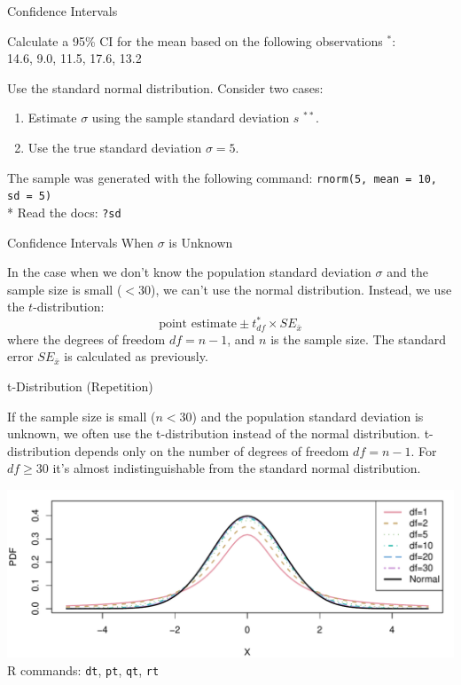 \begin{frame}{Confidence Intervals}

     \begin{example}
         \medskip
         Calculate a 95\% CI for the mean based on the following observations $^{*}$:\\
         14.6, 9.0, 11.5, 17.6, 13.2
         
         Use the standard normal distribution. Consider two cases:
         \begin{enumerate}
             \item Estimate $\sigma$ using the sample standard deviation $s$ $^{**}$.
             \item Use the true standard deviation $\sigma = 5$.
         \end{enumerate}
     \end{example}
    \bigskip

    \tiny * The sample was generated with the following command: \texttt{rnorm(5, mean = 10, sd = 5)}\\
    \tiny ** Read the docs: \texttt{?sd}

\end{frame}

\begin{frame}{Confidence Intervals When $\sigma$ is Unknown}

    In the case when we don't know the population standard deviation $\sigma$ and the sample size is small ($< 30$), we can't use the normal distribution. Instead, we use the $t$-distribution:
    \begin{equation}
    \text{point estimate} \pm t_{df}^* \times SE_{\bar{x}}
    \end{equation}   
    where the degrees of freedom $df = n - 1$, and $n$ is the sample size. The standard error $SE_{\bar{x}}$ is calculated as previously.

\end{frame}

\begin{frame}{t-Distribution (Repetition)}
    
    If the sample size is small ($n < 30$) and the population standard deviation is unknown, we often use the t-distribution instead of the normal distribution. t-distribution depends only on the number of degrees of freedom $df = n - 1$. For $df \ge 30$ it's almost indistinguishable from the standard normal distribution.
    
    \includegraphics[width=\linewidth]{R/plots/t_distribution}
    {\tiny R commands: \texttt{dt}, \texttt{pt}, \texttt{qt}, \texttt{rt}}

\end{frame}

